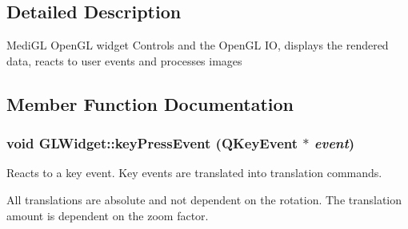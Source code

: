 \subsection{Detailed Description}
MediGL OpenGL widget Controls and the OpenGL IO, displays the rendered data, reacts to user events and processes images 

\subsection{Member Function Documentation}
\hypertarget{class_g_l_widget_a35e6da60485a6b10fe24ac386b708071}{
\subsubsection[{keyPressEvent}]{\setlength{\rightskip}{0pt plus 5cm}void GLWidget::keyPressEvent (QKeyEvent $\ast$ {\em event})}}
\label{class_g_l_widget_a35e6da60485a6b10fe24ac386b708071}
Reacts to a key event. Key events are translated into translation commands.

All translations are absolute and not dependent on the rotation. The translation amount is dependent on the zoom factor.

